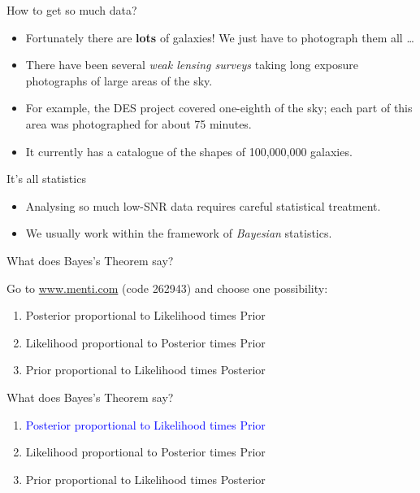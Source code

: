 \documentclass[usenames,dvipsnames]{beamer}
\newcommand{\mentiurl}[0]{{\url{www.menti.com}}}
\newcommand{\menticode}[0]{{262943}}
\newcommand{\mentiinvitation}[0]{Go to \mentiurl{} (code \menticode{}) and choose one possibility:\\}
\newcommand{\correctanswer}[1]{\textcolor{blue}{{#1} \checkmark}}
\begin{document}
\begin{frame}{How to get so much data?}
  \begin{block}{}
    \begin{itemize}
      \item{Fortunately there are \textbf{lots} of galaxies! We just have to photograph them all \ldots}
      \item{There have been several \textit{weak lensing surveys} taking long exposure photographs of large areas of the sky.}
      \item{For example, the DES project covered one-eighth of the sky; each part of this area was photographed for about 75 minutes.}
      \item{It currently has a catalogue of the shapes of 100,000,000 galaxies.}
    \end{itemize}
  \end{block}
\end{frame}

\begin{frame}{It's all statistics}
  \begin{block}{}
    \begin{itemize}
      \item{Analysing so much low-SNR data requires careful statistical treatment.}
      \item{We usually work within the framework of \textit{Bayesian} statistics.}
    \end{itemize}
  \end{block}
\end{frame}

\begin{frame}{What does Bayes's Theorem say?}
  \begin{block}{}
    \mentiinvitation{}
    \begin{enumerate}
      \item{Posterior proportional to Likelihood times Prior}
      \item{Likelihood proportional to Posterior times Prior}
      \item{Prior proportional to Likelihood times Posterior}
    \end{enumerate}
  \end{block}
\end{frame}

\begin{frame}{What does Bayes's Theorem say?}
  \begin{block}{}
    \begin{enumerate}
      \item{\correctanswer{Posterior proportional to Likelihood times Prior}}
      \item{Likelihood proportional to Posterior times Prior}
      \item{Prior proportional to Likelihood times Posterior}
    \end{enumerate}
  \end{block}
\end{frame}
\end{document}
